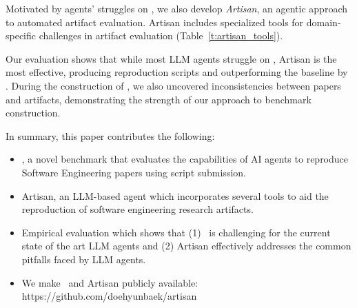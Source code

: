 Motivated by agents’ struggles on \benchmark, we also develop \emph{Artisan}, an agentic approach to automated artifact evaluation.
Artisan includes specialized tools for domain-specific challenges in artifact evaluation (Table~\ref{t:artisan_tools}).

Our evaluation shows that while most LLM agents struggle on \benchmark, Artisan is the most effective, producing \artisanpartial{} reproduction scripts and outperforming the baseline by \artisanpartialoutperform{}.
During the construction of \benchmark, we also uncovered \inconsistencies{} inconsistencies between papers and artifacts, demonstrating the strength of our approach to benchmark construction.

In summary, this paper contributes the following:
\begin{itemize}
    \item \benchmark, a novel benchmark that evaluates the capabilities of AI agents to reproduce Software Engineering papers using script submission.
    \item Artisan, an LLM-based agent which incorporates several tools to aid the reproduction of software engineering research artifacts.
    \item Empirical evaluation which shows that (1) \benchmark~is challenging for the current state of the art LLM agents and (2) Artisan effectively addresses the common pitfalls faced by LLM agents.
    \item We make \benchmark~and Artisan publicly available: https://github.com/doehyunbaek/artisan
\end{itemize}
